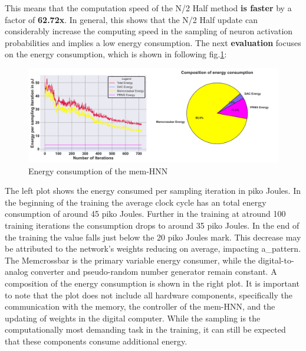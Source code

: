 This means that the computation speed of the N/2 Half method \textbf{is faster} by a factor of \textbf{62.72x}.
In general, this shows that the N/2 Half update can considerably increase the computing speed in the sampling of neuron activation probabilities and
implies a low energy consumption.
The next \textbf{evaluation} focuses on the energy consumption, which is shown in following fig.\ref{Energy output_2}:
\begin{figure}[H]
    \centering
    \includegraphics[width=0.9\linewidth]{graphics/energy_and_averages_plot_4.png}
    \caption{Energy consumption of the \ac{mem-HNN}}
    \label{Energy output_2}
\end{figure}
The left plot shows the energy consumed per sampling iteration in piko Joules.
In the beginning of the training the average clock cycle has an total energy consumption of around 45 piko Joules.
Further in the training at atround 100 training iterations the consumption drops to around 35 piko Joules. 
In the end of the training the value falls just below the 20 piko Joules mark. 
This decrease may be attributed to the network's weights reducing on average, impacting a\_pattern.
The Memcrossbar is the primary variable energy consumer, while the digital-to-analog converter and pseudo-random number generator remain constant. 
A composition of the energy consumption is shown in the right plot.
It is important to note that the plot does not include all hardware components,
specifically the communication with the memory, the controller of the \ac{mem-HNN}, and the updating of weights in the digital computer.
While the sampling is the computationally most demanding task in the training, it can still be expected that these components consume additional energy.


